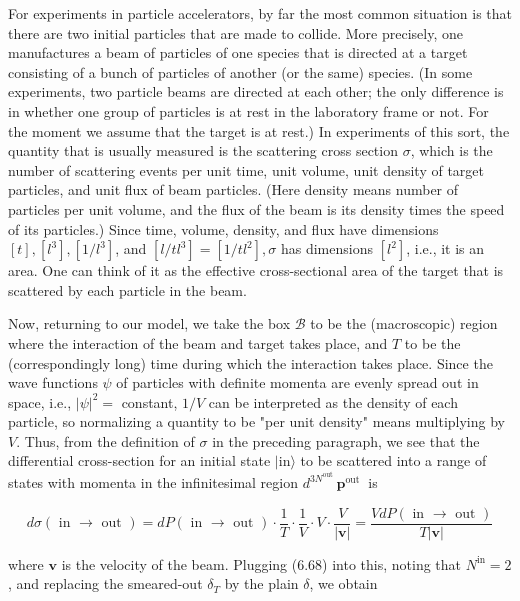 \documentclass[10pt, letterpaper]{article}
\begin{document}
For experiments in particle accelerators, by far the most common situation is that there are two initial particles that are made to collide. More precisely, one manufactures a beam of particles of one species that is directed at a target consisting of a bunch of particles of another (or the same) species. (In some experiments, two particle beams are directed at each other; the only difference is in whether one group of particles is at rest in the laboratory frame or not. For the moment we assume that the target is at rest.) In experiments of this sort, the quantity that is usually measured is the scattering cross section $\sigma$, which is the number of scattering events per unit time, unit volume, unit density of target particles, and unit flux of beam particles. (Here density means number of particles per unit volume, and the flux of the beam is its density times the speed of its particles.) Since time, volume, density, and flux have dimensions $[t],\left[l^{3}\right],\left[1 / l^{3}\right]$, and $\left[l / t l^{3}\right]=\left[1 / t l^{2}\right], \sigma$ has dimensions $\left[l^{2}\right]$, i.e., it is an area. One can think of it as the effective cross-sectional area of the target that is scattered by each particle in the beam.

Now, returning to our model, we take the box $\mathcal{B}$ to be the (macroscopic) region where the interaction of the beam and target takes place, and $T$ to be the (correspondingly long) time during which the interaction takes place. Since the wave functions $\psi$ of particles with definite momenta are evenly spread out in space, i.e., $|\psi|^{2}=$ constant, $1 / V$ can be interpreted as the density of each particle, so normalizing a quantity to be "per unit density" means multiplying by $V$. Thus, from the definition of $\sigma$ in the preceding paragraph, we see that the differential cross-section for an initial state $|\mathrm{in}\rangle$ to be scattered into a range of states with momenta in the infinitesimal region $d^{3 N^{\text {out }}} \mathbf{p}^{\text {out }}$ is

$$
d \sigma(\text { in } \rightarrow \text { out })=d P(\text { in } \rightarrow \text { out }) \cdot \frac{1}{T} \cdot \frac{1}{V} \cdot V \cdot \frac{V}{|\mathbf{v}|}=\frac{V d P(\text { in } \rightarrow \text { out })}{T|\mathbf{v}|}
$$

where $\mathbf{v}$ is the velocity of the beam. Plugging (6.68) into this, noting that $N^{\mathrm{in}}=2$, and replacing the smeared-out $\delta_{T}$ by the plain $\delta$, we obtain
\end{document}

